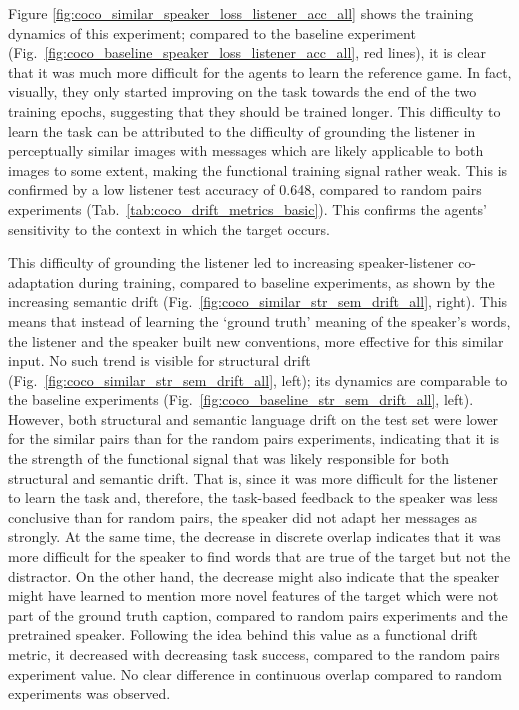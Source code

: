 Figure \ref{fig:coco_similar_speaker_loss_listener_acc_all} shows the training dynamics of this experiment; compared to the baseline experiment (Fig.~\ref{fig:coco_baseline_speaker_loss_listener_acc_all}, red lines), it is clear that it was much more difficult for the agents to learn the reference game. In fact, visually, they only started improving on the task towards the end of the two training epochs, suggesting that they should be trained longer. This difficulty to learn the task can be attributed to the difficulty of grounding the listener in perceptually similar images with messages which are likely applicable to both images to some extent, making the functional training signal rather weak. This is confirmed by a low listener test accuracy of 0.648, compared to random pairs experiments (Tab.~\ref{tab:coco_drift_metrics_basic}). This confirms the agents' sensitivity to the context in which the target occurs. 

This difficulty of grounding the listener led to increasing speaker-listener co-adaptation during training, compared to baseline experiments, as shown by the increasing semantic drift (Fig.~\ref{fig:coco_similar_str_sem_drift_all}, right). This means that instead of learning the `ground truth' meaning of the speaker's words, the listener and the speaker built new conventions, more effective for this similar input. No such trend is visible for structural drift (Fig.~\ref{fig:coco_similar_str_sem_drift_all}, left); its dynamics are comparable to the baseline experiments (Fig.~\ref{fig:coco_baseline_str_sem_drift_all}, left). 
However, both structural and semantic language drift on the test set were lower for the similar pairs than for the random pairs experiments, indicating that it is the strength of the functional signal that was likely responsible for both structural and semantic drift. That is, since it was more difficult for the listener to learn the task and, therefore, the task-based feedback to the speaker was less conclusive than for random pairs, the speaker did not adapt her messages as strongly.
At the same time, the decrease in discrete overlap indicates that it was more difficult for the speaker to find words that are true of the target but not the distractor. On the other hand, the decrease might also indicate that the speaker might have learned to mention more novel features of the target which were not part of the ground truth caption, compared to random pairs experiments and the pretrained speaker. Following the idea behind this value as a functional drift metric, it decreased with decreasing task success, compared to the random pairs experiment value. No clear difference in continuous overlap compared to random experiments was observed.

